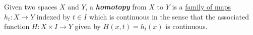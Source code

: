 \documentclass[preview]{standalone}
\begin{document}
\begin{center}
Given two spaces $X$ and $Y$, a \textbf{\textit{homotopy}} from $X$ to $Y$ is a \underline{family of maps} $h_t : X \to Y$ indexed by $t \in I$ which is continuous in the sense that the associated function $H : X \times I \to Y$ given by $H(x,t) = h_t(x)$ is continuous.
\end{center}
\end{document}

